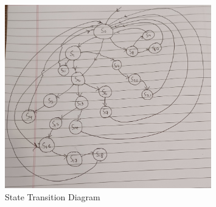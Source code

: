 \documentclass[]{report}
\begin{document}
        \begin{figure}[H]
            \begin{center}
                \includegraphics*[width=0.8\textwidth]{StateDiagram.jpg}
                \caption{State Transition Diagram}
            \end{center}
        \end{figure}
            
\end{document}
